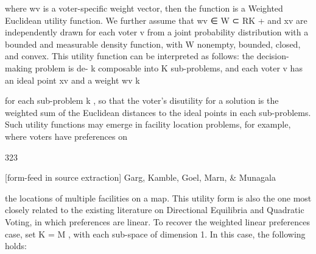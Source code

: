 \documentclass[10pt]{article}
\begin{document}
\begin{ReviewVerbatim}
where wv is a voter-specific weight vector, then the function is a Weighted Euclidean utility
function. We further assume that wv ∈ W ⊂ RK      + and xv are independently drawn for each
voter v from a joint probability distribution with a bounded and measurable density function,
with W nonempty, bounded, closed, and convex.
   This utility function can be interpreted as follows: the decision-making problem is de-
                                                                           k
composable into K sub-problems, and each voter v has an ideal point xv and a weight wv
                                                                                               k

for each sub-problem k , so that the voter's disutility for a solution is the weighted sum of
the Euclidean distances to the ideal points in each sub-problems.       Such utility functions
may emerge in facility location problems, for example, where voters have preferences on



                                               323

[form-feed in source extraction]
                        Garg, Kamble, Goel, Marn, & Munagala


the locations of multiple facilities on a map. This utility form is also the one most closely
related to the existing literature on Directional Equilibria and Quadratic Voting, in which
preferences are linear. To recover the weighted linear preferences case, set K      = M , with
each sub-space of dimension 1. In this case, the following holds:
\end{ReviewVerbatim}
\end{document}
